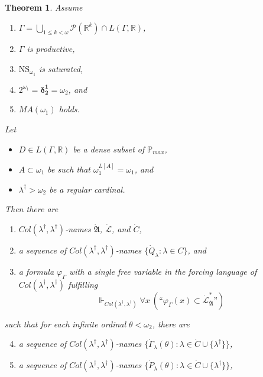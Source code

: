 \documentclass[12pt, twoside]{memoir}
\numberwithin{equation}{section}
\newtheorem{thm}{Theorem}[section]
\theoremstyle{definition}
\theoremstyle{remark}
\theoremstyle{definition}
\theoremstyle{definition}
\theoremstyle{definition}
\theoremstyle{remark}
\begin{document}
\begin{thm}
Assume
\begin{enumerate}[label=(\roman*), leftmargin=40pt]
    \item $\Gamma  = \bigcup_{1 \leq k < \omega} \mathcal{P}(\mathbb{R}^{k}) \cap L(\Gamma, \mathbb{R})$,
    \item $\Gamma$ is productive,
    \item $\mathrm{NS}_{\omega_1}$ is saturated,
    \item $2^{\omega_1} = \mathbf{\delta^1_2} = \omega_2$, and
    \item $MA(\omega_1)$ holds.
\end{enumerate}
Let 
\begin{itemize}
    \item $D \in L(\Gamma, \mathbb{R})$ be a dense subset of $\mathbb{P}_{max}$,
    \item $A \subset \omega_1$ be such that $\omega_1^{L[A]} = \omega_1$, and
    \item $\lambda^{\dagger} > \omega_2$ be a regular cardinal.
\end{itemize}
Then there are 
\begin{enumerate}[label=(\arabic*)]
    \item $Col(\lambda^{\dagger}, \lambda^{\dagger})$-names $\dot{\mathfrak{A}}$, $\dot{\mathcal{L}}$, and $\dot{C}$, 
    \item a sequence of $Col(\lambda^{\dagger}, \lambda^{\dagger})$-names $\{\dot{Q}_{\lambda} : \lambda \in C\}$, and
    \item a formula $\varphi_{\Gamma}$ with a single free variable in the forcing language of $Col(\lambda^{\dagger}, \lambda^{\dagger})$ fulfilling
    \begin{equation*}
        \Vdash_{Col(\lambda^{\dagger}, \lambda^{\dagger})} \forall x \ (\text{``} \varphi_{\Gamma}(x) \subset \dot{\mathcal{L}}^*_{\dot{\mathfrak{A}}} \text{''})
    \end{equation*}
\end{enumerate}
such that for each infinite ordinal $\theta < \omega_2$, there are
\begin{enumerate}[label=(\arabic*)]
    \setcounter{enumi}{3}
    \item a sequence of $Col(\lambda^{\dagger}, \lambda^{\dagger})$-names $\{\dot{\Gamma}_{\lambda}(\theta) : \lambda \in \dot{C} \cup \{\lambda^{\dagger}\}\}$,
    \item a sequence of $Col(\lambda^{\dagger}, \lambda^{\dagger})$-names $\{\dot{P}_{\lambda}(\theta) : \lambda \in \dot{C} \cup \{\lambda^{\dagger}\}\}$,

\end{enumerate}
\end{thm}
\end{document}
